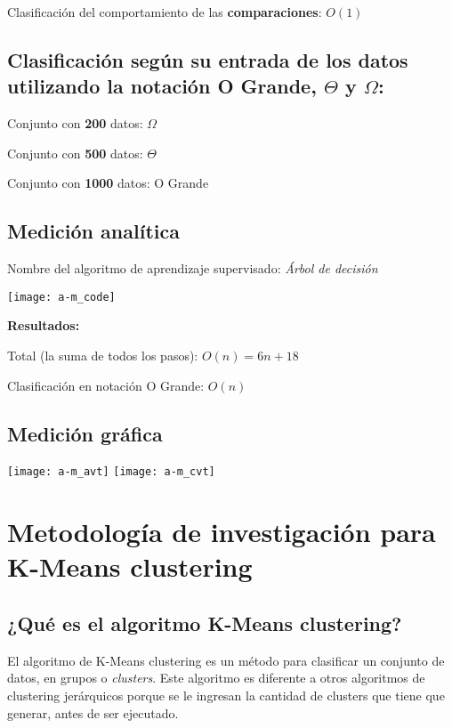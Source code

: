 \documentclass{article}
\begin{document}
Clasificación del comportamiento de las \textbf{comparaciones}: \(O(1)\)

\subsection{Clasificación según su entrada de los datos utilizando la notación O Grande, \(\Theta\) y \(\Omega\):}

Conjunto con \textbf{200} datos:  \(\Omega\)

Conjunto con \textbf{500} datos: \(\Theta\)

Conjunto con \textbf{1000} datos:  O Grande

\subsection{Medición analítica}
Nombre del algoritmo de aprendizaje supervisado: \textit{Árbol de decisión}

\begin{center}
  \texttt{[image: a-m\_code]}
\end{center}

\textbf{Resultados:}

Total (la suma de todos los pasos): \(O(n) = 6n+18\)

Clasificación en notación O Grande: \(O(n)\)

\subsection{Medición gráfica}

\begin{center}
  \texttt{[image: a-m\_avt]}
  \texttt{[image: a-m\_cvt]}
\end{center}


\section{Metodología de investigación para K-Means clustering}
\subsection{¿Qué es el algoritmo K-Means clustering?}
El algoritmo de K-Means clustering es un método para clasificar un conjunto de datos, en grupos o \textit{clusters}. Este algoritmo es diferente a otros algoritmos de clustering jerárquicos porque se le ingresan la cantidad de clusters que tiene que generar, antes de ser ejecutado.
\end{document}
